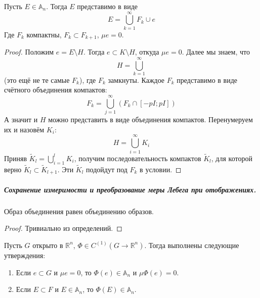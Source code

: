 \documentclass{article}
\begin{document}
    \begin{corollary}
        \label{Структура произвольного измеримого множества}
        Пусть $E\in\mathbb A_n$. Тогда $E$ представимо в виде
        $$
        E=\bigcup\limits_{k=1}^\infty F_k\cup e
        $$
        Где $F_k$ компактны, $F_k\subset F_{k+1}$, $\mu e=0$.
    \end{corollary}
    \begin{proof}
        Положим $e=E\setminus H$. Тогда $e\subset K\setminus H$, откуда $\mu e=0$. Далее мы знаем, что
        $$
        H=\bigcup\limits_{k=1}^\infty
        $$
        (это ещё не те самые $F_k$), где $F_k$ замкнуты. Каждое $F_k$ представимо в виде счётного объединения компактов:
        $$
        F_k=\bigcup\limits_{j=1}^\infty(F_k\cap[-pI;pI])
        $$
        А значит и $H$ можно представить в виде объединения компактов. Перенумеруем их и назовём $K_i$:
        $$
        H=\bigcup\limits_{i=1}^\infty K_i
        $$
        Приняв $\widetilde K_l=\bigcup\limits_{i=1}^lK_i$, получим последовательность компактов $\widetilde K_l$, для которой верно $\widetilde K_l\subset\widetilde K_{l+1}$. Эти $\widetilde K_l$ подойдут под $F_k$ в условии.
    \end{proof}
    \subparagraph{Сохранение измеримости и преобразование меры Лебега при отображениях.}
    \begin{claim}
        \label{Образ объединения равен объединению образов}
        Образ объединения равен объединению образов.
    \end{claim}
    \begin{proof}
        Тривиально из определений.
    \end{proof}
    \begin{theorem}
        \label{Сохранение измеримости при гладком отображении}
        Пусть $G$ открыто в $\mathbb R^n$, $\Phi\in C^{(1)}(G\to\mathbb R^n)$. Тогда выполнены следующие утверждения:
        \begin{enumerate}
            \item Если $e\subset G$ и $\mu e=0$, то $\Phi(e)\in\mathbb A_n$ и $\mu\Phi(e)=0$.
            \item Если $E\subset F$ и $E\in\mathbb A_n$, то $\Phi(E)\in\mathbb A_n$.
        \end{enumerate}
    \end{theorem}
\end{document}
